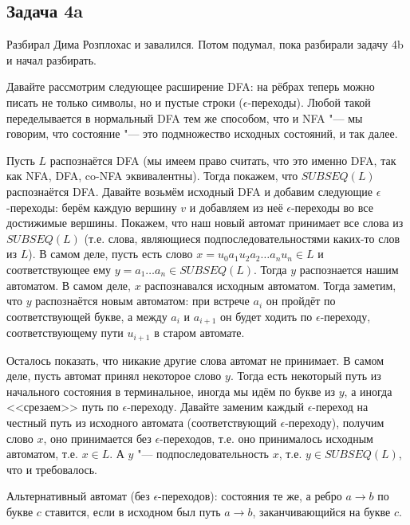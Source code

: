 \subsection{Задача 4a}
	Разбирал Дима Розплохас и завалился.
	Потом подумал, пока разбирали задачу 4b и начал разбирать.

	Давайте рассмотрим следующее расширение DFA: на рёбрах теперь можно писать не только
	символы, но и пустые строки ($\epsilon$-переходы).
	Любой такой переделывается в нормальный DFA тем же способом, что и NFA "--- мы говорим,
	что состояние "--- это подмножество исходных состояний, и так далее.

	Пусть $L$ распознаётся DFA (мы имеем право считать, что это именно DFA, так как NFA, DFA, co-NFA эквивалентны).
	Тогда покажем, что $SUBSEQ(L)$ распознаётся DFA.
	Давайте возьмём исходный DFA и добавим следующие $\epsilon$-переходы:
	берём каждую вершину $v$ и добавляем из неё $\epsilon$-переходы во все достижимые вершины.
	Покажем, что наш новый автомат принимает все слова из $SUBSEQ(L)$
	(т.е. слова, являющиеся подпоследовательностями каких-то слов из $L$).
	В самом деле, пусть есть слово $x=u_0a_1u_2a_2\dots a_nu_n \in L$ и соответствующее
	ему $y = a_1\dots a_n \in SUBSEQ(L)$.
	Тогда $y$ распознается нашим автоматом.
	В самом деле, $x$ распознавался исходным автоматом.
	Тогда заметим, что $y$ распознаётся новым автоматом: при встрече $a_i$ он пройдёт по соответствующей букве,
	а между $a_i$ и $a_{i+1}$ он будет ходить по $\epsilon$-переходу, соответствующему пути $u_{i+1}$
	в старом автомате.

	Осталось показать, что никакие другие слова автомат не принимает.
	В самом деле, пусть автомат принял некоторое слово $y$.
	Тогда есть некоторый путь из начального состояния в терминальное, иногда мы идём по букве
	из $y$, а иногда <<срезаем>> путь по $\epsilon$-переходу.
	Давайте заменим каждый $\epsilon$-переход на честный путь из исходного автомата (соответствующий $\epsilon$-переходу),
	получим	слово $x$, оно принимается без $\epsilon$-переходов, т.е. оно принималось исходным автоматом, т.е. $x \in L$.
	А $y$ "--- подпоследовательность $x$, т.е. $y \in SUBSEQ(L)$, что и требовалось.

	\begin{Rem}
		Альтернативный автомат (без $\epsilon$-переходов): состояния те же,
		а ребро $a\to b$ по букве $c$ ставится, если в исходном был путь $a \to b$,
		заканчивающийся на букве $c$.
	\end{Rem}

